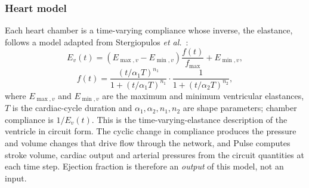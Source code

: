 \documentclass[conference]{IEEEtran}
\begin{document}
\subsubsection{Heart model}
Each heart chamber is a time-varying compliance whose inverse, the elastance, follows a model adapted from Stergiopulos \textit{et al.}\ \cite{stergiopulos1996}:
\begin{equation}
E_v(t)=\left(E_{\max,v}-E_{\min,v}\right)\frac{f(t)}{f_{\max}}+E_{\min,v},
\label{eq:elastance}
\end{equation}
\begin{equation}
f(t)=\frac{\left(t/\alpha_1T\right)^{n_1}}{1+\left(t/\alpha_1T\right)^{n_1}}\cdot\frac{1}{1+\left(t/\alpha_2T\right)^{n_2}},
\label{eq:hill}
\end{equation}
where $E_{\max,v}$ and $E_{\min,v}$ are the maximum and minimum ventricular elastances, $T$ is the cardiac-cycle duration and $\alpha_1,\alpha_2,n_1,n_2$ are shape parameters; chamber compliance is $1/E_v(t)$. This is the time-varying-elastance description of the ventricle \cite{suga1974elastance} in circuit form. The cyclic change in compliance produces the pressure and volume changes that drive flow through the network, and Pulse computes stroke volume, cardiac output and arterial pressures from the circuit quantities at each time step. Ejection fraction is therefore an \emph{output} of this model, not an input.
\end{document}
